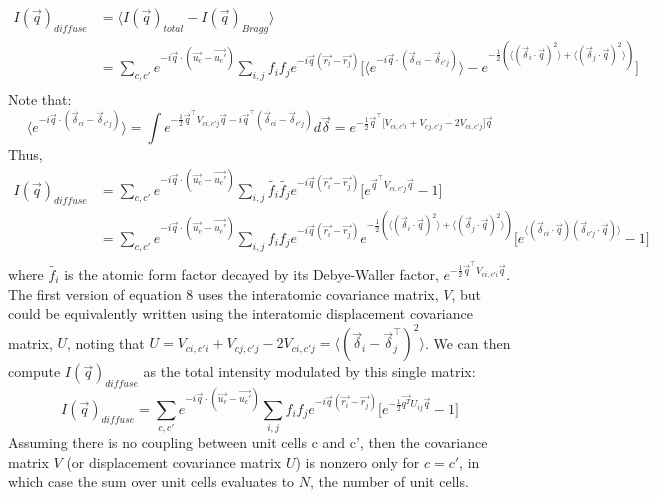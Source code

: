 \documentclass{article}
\begin{document}
\begin{equation}
\begin{aligned}
I(\vec{q})_{diffuse} & = \langle I(\vec{q})_{total} - I(\vec{q})_{Bragg} \rangle \\
& = \sum\limits_{c,c'} e^{-i \vec{q} \cdot (\vec{u_c} - \vec{u_c'})} \sum\limits_{i,j} f_i f_j e^{-i \vec{q} (\vec{r_i} - \vec{r_j})} \lbrack \langle e^{ -i \vec{q} \cdot (\vec{\delta}_{ci} - \vec{\delta}_{c'j} )} \rangle -  e^{-\frac{1}{2} (\langle (\vec{\delta}_i \cdot \vec{q})^2 \rangle + \langle (\vec{\delta}_j \cdot \vec{q})^2 \rangle) } \rbrack \\
\end{aligned}
\end{equation}
Note that:
\begin{equation}
\langle e^{-i {\vec{q}} \cdot (\vec{\delta}_{ci} - \vec{\delta}_{c'j}) } \rangle = \int e^{-\frac{1}{2} \vec{q}^\intercal V_{ci,c'j} \vec{q} - i \vec{q}^\intercal (\vec{\delta}_{ci} - \vec{\delta}_{c'j}) } d \vec{\delta} = e^{ -\frac{1}{2} \vec{q}^\intercal \lbrack V_{ci,c'i} + V_{cj,c'j} - 2V_{ci,c'j} \rbrack \vec{q} }
\end{equation}
Thus,
\begin{equation}
\begin{aligned}
I(\vec{q})_{diffuse} & = \sum\limits_{c,c'} e^{-i \vec{q} \cdot (\vec{u_c} - \vec{u_c'})} \sum\limits_{i,j} \tilde{f_i} \tilde{f_j} e^{-i \vec{q} (\vec{r_i} - \vec{r_j})} \lbrack e^{ \vec{q}^\intercal V_{ci,c'j} \vec{q} } - 1 \rbrack \\
& = \sum\limits_{c,c'} e^{-i \vec{q} \cdot (\vec{u_c} - \vec{u_c'})} \sum\limits_{i,j} f_i f_j e^{-i \vec{q} (\vec{r_i} - \vec{r_j})} e^{-\frac{1}{2} (\langle (\vec{\delta}_i \cdot \vec{q})^2 \rangle + \langle (\vec{\delta}_j \cdot \vec{q})^2 \rangle) } \lbrack e^{\langle ( \vec{\delta}_{ci} \cdot \vec{q} ) ( \vec{\delta}_{c'j} \cdot \vec{q} ) \rangle} - 1 \rbrack \\
\end{aligned}
\end{equation}
where $\tilde{f_i}$ is the atomic form factor decayed by its Debye-Waller factor, $e^{ -\frac{1}{2} \vec{q}^\intercal V_{ci,c'i} \vec{q} }$. The first version of equation 8 uses the interatomic covariance matrix, $V$, but could be equivalently written using the interatomic displacement covariance matrix, $U$, noting that $U = V_{ci,c'i} + V_{cj,c'j} - 2V_{ci,c'j} = \langle (\vec{\delta}_i - \vec{\delta}_j ^\intercal)^2 \rangle $. We can then compute $I(\vec{q})_{diffuse}$ as the total intensity modulated by this single matrix:
\begin{equation}
I(\vec{q})_{diffuse} = \sum\limits_{c,c'} e^{-i \vec{q} \cdot (\vec{u_c} - \vec{u_c'})} \sum\limits_{i,j} f_i f_j e^{-i \vec{q} (\vec{r_i} - \vec{r_j})} \lbrack e^{-\frac{1}{2}\vec{q^T}U_{ij}\vec{q}} - 1 \rbrack
\end{equation}
Assuming there is no coupling between unit cells c and c', then the covariance matrix $V$ (or displacement covariance matrix $U$) is nonzero only for $c=c'$, in which case the sum over unit cells evaluates to $N$, the number of unit cells.
\end{document}
